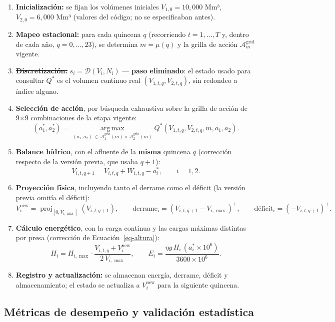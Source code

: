 \documentclass[
  spanish,
  letterpaper,
]{scrreprt}
\theoremstyle{definition}
\theoremstyle{remark}
\begin{document}
\begin{enumerate}
\def\labelenumi{\arabic{enumi}.}
\item
  \textbf{Inicialización:} se fijan los volúmenes iniciales
  \(V_{1,0}=10{,}000\) Mm³, \(V_{2,0}=6{,}000\) Mm³ (valores del código;
  no se especificaban antes).
\item
  \textbf{Mapeo estacional:} para cada quincena \(q\) (recorriendo
  \(t=1,\dots,T\) y, dentro de cada año, \(q=0,\dots,23\)), se determina
  \(m=\mu(q)\) y la grilla de acción \(\mathcal A_m^{\text{grid}}\)
  vigente.
\item
  \st{\textbf{Discretización:}} \(s_i=\mathcal D(V_i,N_i)\) ---
  \textbf{paso eliminado}: el estado usado para consultar \(Q^*\) es el
  volumen continuo real \((V_{1,t,q}, V_{2,t,q})\), sin redondeo a
  índice alguno.
\item
  \textbf{Selección de acción}, por búsqueda exhaustiva sobre la grilla
  de acción de 9×9 combinaciones de la etapa vigente:
  \[(a_1^*,a_2^*) = \operatorname*{arg\,max}_{(a_1,a_2)\,\in\,\mathcal A_1^{\text{grid}}(m)\times\mathcal A_2^{\text{grid}}(m)} Q^{*}(V_{1,t,q},V_{2,t,q},m,a_1,a_2).\]
\item
  \textbf{Balance hídrico}, con el afluente de la \textbf{misma}
  quincena \(q\) (corrección respecto de la versión previa, que usaba
  \(q+1\)):
  \[V_{i,t,q+1} = V_{i,t,q} + W_{i,t,q} - a_i^*, \qquad i=1,2.\]
\item
  \textbf{Proyección física}, incluyendo tanto el derrame como el
  déficit (la versión previa omitía el déficit):
  \[V_i^{\text{new}} = \operatorname{proj}_{[0,V_{i,\max}]}(V_{i,t,q+1}), \qquad
  \text{derrame}_i = (V_{i,t,q+1}-V_{i,\max})^+, \qquad
  \text{déficit}_i = (-V_{i,t,q+1})^+.\]
\item
  \textbf{Cálculo energético}, con la carga continua y las cargas
  máximas distintas por presa (corrección de Ecuación~\ref{eq-altura}):
  \[H_i = H_{i,\max}\cdot\frac{V_{i,t,q}+V_i^{\text{new}}}{2\,V_{i,\max}}, \qquad
  E_i = \frac{\eta g\, H_i\,(a_i^*\times10^6)}{3600\times10^6}.\]
\item
  \textbf{Registro y actualización:} se almacenan energía, derrame,
  déficit y almacenamiento; el estado se actualiza a
  \(V_i^{\text{new}}\) para la siguiente quincena.
\end{enumerate}

\subsection{Métricas de desempeño y validación
estadística}\label{sec-metricas}
\end{document}
